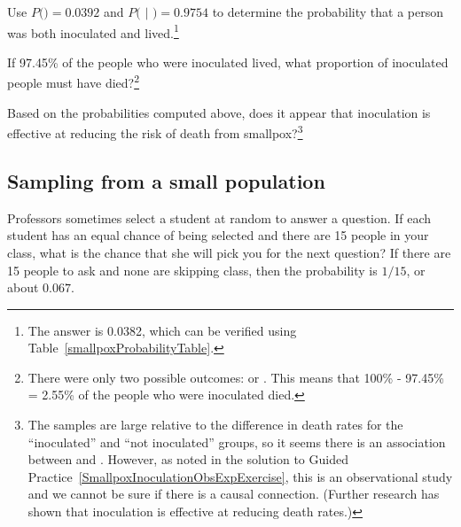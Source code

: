 \begin{exercise}
Use $P($$) = 0.0392$ and $P($ $|$ $) = 0.9754$ to determine the probability that a person was both inoculated and lived.\footnote{The answer is 0.0382, which can be verified using Table~\ref{smallpoxProbabilityTable}.}
\end{exercise}

\begin{exercise}
If 97.45\% of the people who were inoculated lived, what proportion of inoculated people must have died?\footnote{There were only two possible outcomes:  or . This means that 100\% - 97.45\% = 2.55\% of the people who were inoculated died.}
\end{exercise}

\begin{exercise}
Based on the probabilities computed above, does it appear that inoculation is effective at reducing the risk of death from smallpox?\footnote{The samples are large relative to the difference in death rates for the ``inoculated'' and ``not inoculated'' groups, so it seems there is an association between  and . However, as noted in the solution to Guided Practice~\ref{SmallpoxInoculationObsExpExercise}, this is an observational study and we cannot be sure if there is a causal connection. (Further research has shown that inoculation is effective at reducing death rates.)}
\end{exercise}


\subsection{Sampling from a small population}
\label{smallPop}

\begin{example}{Professors sometimes select a student at random to answer a question. If each student has an equal chance of being selected and there are 15 people in your class, what is the chance that she will pick you for the next question?}
If there are 15 people to ask and none are skipping class, then the probability is $1/15$, or about $0.067$.
\end{example}

